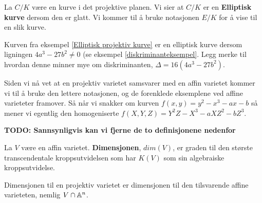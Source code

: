\begin{definisjon}
La $C/K$ være en kurve i det projektive planen. Vi sier at $C/K$ er en \textbf{Elliptisk kurve} dersom den er glatt. Vi kommer til å bruke notasjonen $E/K$ for å vise til en slik kurve.
\end{definisjon}

\begin{eksempel}
Kurven fra eksempel \ref{Elliptisk projektiv kurve} er en elliptisk kurve dersom ligningen $4a^3 - 27b^2 \neq 0$ (se eksempel \ref{diskriminanteksempel}. Legg merke til hvordan denne minner mye om diskriminanten, $\Delta = 16(4a^3 - 27b^2)$.
\end{eksempel}

Siden vi nå vet at en projektiv varietet samsvarer med en affin varietet kommer vi til å bruke den lettere notasjonen, og de forenklede eksemplene ved affine varieteter framover. Så når vi snakker om kurven $f(x,y) = y^2 - x^3 - ax - b$ så mener vi egentlig den homogeniserte $f(X,Y,Z) = Y^2Z - X^3 - aXZ^2 - bZ^3$.


\textbf{TODO: Sannsynligvis kan vi fjerne de to definisjonene nedenfor}
\begin{definisjon}
La $V$ være en affin varietet. \textbf{Dimensjonen}, $dim(V)$, er graden til den største transcendentale kroppsutvidelsen som har $K(V)$ som sin algebraiske kroppsutvidelse.
\end{definisjon}


\begin{definisjon}
Dimensjonen til en projektiv varietet er dimensjonen til den tilsvarende affine varieteten, nemlig $V \cap \mathbb{A} ^n$.
\end{definisjon}

